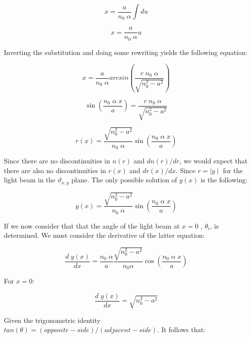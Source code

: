 \documentclass{article}
\begin{document}
\begin{equation*}
	x = \frac{a}{n_0 \; \alpha} \int du
\end{equation*}

\begin{equation*}
	x = \frac{a}{n_0 \; \alpha} u
\end{equation*}

Inverting the substitution and doing some rewriting yields the following equation:

\begin{equation*}
	x = \frac{a}{n_0 \; \alpha} arcsin \left( \frac{r \; n_0 \; \alpha}{\sqrt{n_0^2-a^2}} \right)
\end{equation*}

\begin{equation*}
	\sin \left( \frac{n_0 \; \alpha \; x}{a} \right) =  \frac{r \; n_0 \; \alpha}{\sqrt{n_0^2-a^2}}
\end{equation*}

\begin{equation*}
	r(x) = \frac{\sqrt{n_0^2-a^2}}{n_0 \; \alpha} \sin \left( \frac{n_0 \; \alpha \; x}{a} \right)
\end{equation*}

Since there are no discontinuities in $n(r)$ and $dn(r)/dr$, we would expect that there are also no discontinuities in $r(x)$ and $dr(x)/dx$. Since $r = \mid y \mid$ for the light beam in the $\vartheta _{x,y}$ plane. The only possible solution of $y(x)$ is the following:

\begin{equation}
	y(x) = \frac{\sqrt{n_0^2-a^2}}{n_0 \;\alpha} \sin \left( \frac{n_0 \; \alpha \; x}{a}\right)
	\label{eq_fibre_path}
\end{equation}

If we now consider that that the angle of the light beam at $x=0$ , $\theta _i$, is determined. We must consider the derivative of the latter equation:

\begin{equation*}
	\frac{d \; y(x)}{dx} =  \frac{n_0 \; \alpha}{a} \frac{\sqrt{n_0^2-a^2} }{n_0 \alpha} \cos \left( \frac{n_0 \; \alpha \; x}{a}\right)
\end{equation*}

For $x=0$:

\begin{equation*}
	\frac{d \; y(x)}{dx} =  \sqrt{n_0^2-a^2}
\end{equation*}

Given the trigonometric identity $tan (\theta) = (opposite-side)/(adjacent-side)$. It follows that:
\end{document}
